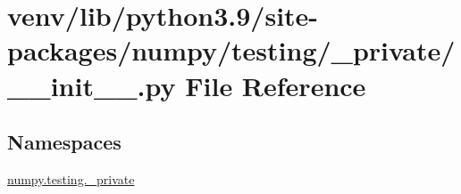 \hypertarget{venv_2lib_2python3_89_2site-packages_2numpy_2testing_2__private_2____init_____8py}{}\section{venv/lib/python3.9/site-\/packages/numpy/testing/\+\_\+private/\+\_\+\+\_\+init\+\_\+\+\_\+.py File Reference}
\label{venv_2lib_2python3_89_2site-packages_2numpy_2testing_2__private_2____init_____8py}
\subsection*{Namespaces}
\begin{DoxyCompactItemize}
\item 
 \hyperlink{namespacenumpy_1_1testing_1_1__private}{numpy.\+testing.\+\_\+private}
\end{DoxyCompactItemize}
